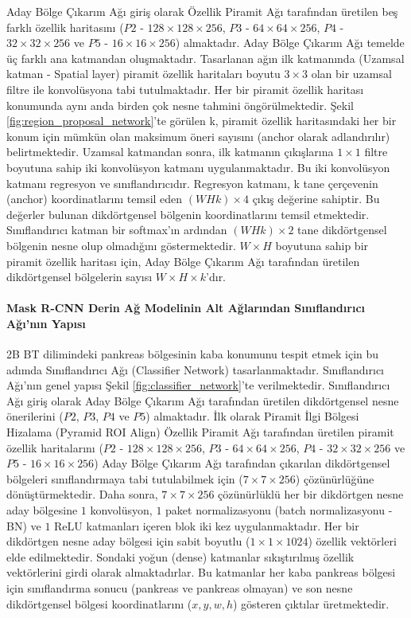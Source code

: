 Aday Bölge Çıkarım Ağı giriş olarak Özellik Piramit Ağı tarafından üretilen beş farklı özellik haritasını ($P2$ - $128 \times 128 \times 256$, $P3$ - $64 \times 64 \times 256$, $P4$ - $32 \times 32 \times 256$ ve $P5$ - $16 \times 16 \times 256$) almaktadır. Aday Bölge Çıkarım Ağı temelde üç farklı ana katmandan oluşmaktadır. Tasarlanan ağın ilk katmanında (Uzamsal katman - Spatial layer) piramit özellik haritaları boyutu $3 \times 3$ olan bir uzamsal filtre ile konvolüsyona tabi tutulmaktadır. Her bir piramit özellik haritası konumunda aynı anda birden çok nesne tahmini öngörülmektedir. Şekil \ref{fig:region_proposal_network}’te görülen k, piramit özellik haritasındaki her bir konum için mümkün olan maksimum öneri sayısını (anchor olarak adlandırılır) belirtmektedir. Uzamsal katmandan sonra, ilk katmanın çıkışlarına $1 \times 1$ filtre boyutuna sahip iki konvolüsyon katmanı uygulanmaktadır. Bu iki konvolüsyon katmanı regresyon ve sınıflandırıcıdır. Regresyon katmanı, k tane çerçevenin (anchor) koordinatlarını temsil eden $(WHk) \times 4$ çıkış değerine sahiptir. Bu değerler bulunan dikdörtgensel bölgenin koordinatlarını temsil etmektedir. Sınıflandırıcı katman bir softmax’ın ardından $(WHk) \times 2$ tane dikdörtgensel bölgenin nesne olup olmadığını göstermektedir.  $W \times H$ boyutuna sahip bir piramit özellik haritası için, Aday Bölge Çıkarım Ağı tarafından üretilen dikdörtgensel bölgelerin sayısı $W \times H \times k$’dır.

\paragraph{Mask R-CNN Derin Ağ Modelinin Alt Ağlarından Sınıflandırıcı Ağı'nın Yapısı}
2B BT dilimindeki pankreas bölgesinin kaba konumunu tespit etmek için bu adımda Sınıflandırıcı Ağı (Classifier Network) tasarlanmaktadır. Sınıflandırıcı Ağı'nın genel yapısı Şekil \ref{fig:classifier_network}’te verilmektedir. Sınıflandırıcı Ağı giriş olarak Aday Bölge Çıkarım Ağı tarafından üretilen dikdörtgensel nesne önerilerini ($P2$, $P3$, $P4$ ve $P5$) almaktadır. İlk olarak Piramit İlgi Bölgesi Hizalama (Pyramid ROI Align) Özellik Piramit Ağı tarafından üretilen piramit özellik haritalarını ($P2$ - $128 \times 128 \times 256$, $P3$ - $64 \times 64 \times 256$, $P4$ - $32 \times 32 \times 256$ ve $P5$ - $16 \times 16 \times 256$) Aday Bölge Çıkarım Ağı tarafından çıkarılan dikdörtgensel bölgeleri sınıflandırmaya tabi tutulabilmek için ($7 \times 7 \times 256$) çözünürlüğüne dönüştürmektedir. Daha sonra, $7 \times 7 \times 256$ çözünürlüklü her bir dikdörtgen nesne aday bölgesine $1$ konvolüsyon, $1$ paket normalizasyonu (batch normalizasyonu - BN) ve $1$ ReLU katmanları içeren blok iki kez uygulanmaktadır.  Her bir dikdörtgen nesne aday bölgesi için sabit boyutlu ($1 \times 1 \times 1024$) özellik vektörleri elde edilmektedir. Sondaki yoğun (dense) katmanlar sıkıştırılmış özellik vektörlerini girdi olarak almaktadırlar. Bu katmanlar her kaba pankreas bölgesi için sınıflandırma sonucu (pankreas ve pankreas olmayan) ve son nesne dikdörtgensel bölgesi koordinatlarını ($x,y,w,h$) gösteren çıktılar üretmektedir.

